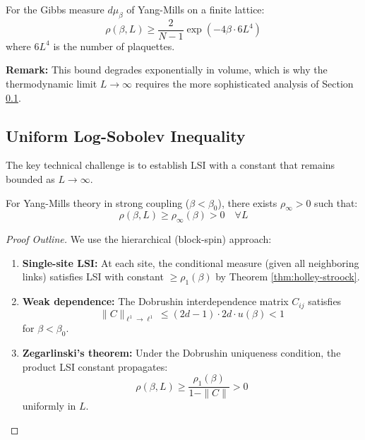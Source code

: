 \begin{corollary}\label{cor:ym-lsi}
For the Gibbs measure $d\mu_\beta$ of Yang-Mills on a finite lattice:
\begin{equation}
    \rho(\beta, L) \geq \frac{2}{N-1} \exp\left(-4\beta \cdot 6L^4\right)
\end{equation}
where $6L^4$ is the number of plaquettes.
\end{corollary}

\textbf{Remark:} This bound degrades exponentially in volume, which is why the thermodynamic limit $L \to \infty$ requires the more sophisticated analysis of Section \ref{sec:uniform-lsi-ch1}.

\subsection{Uniform Log-Sobolev Inequality}
\label{sec:uniform-lsi-ch1}

The key technical challenge is to establish LSI with a constant that remains bounded as $L \to \infty$.

\begin{theorem}\label{thm:zegarlinski}
For Yang-Mills theory in strong coupling ($\beta < \beta_0$), there exists $\rho_\infty > 0$ such that:
\begin{equation}
    \rho(\beta, L) \geq \rho_\infty(\beta) > 0 \quad \forall L
\end{equation}
\end{theorem}

\begin{proof}[Proof Outline]
We use the hierarchical (block-spin) approach:
\begin{enumerate}
    \item \textbf{Single-site LSI:} At each site, the conditional measure (given all neighboring links) satisfies LSI with constant $\geq \rho_1(\beta)$ by Theorem \ref{thm:holley-stroock}.
    
    \item \textbf{Weak dependence:} The Dobrushin interdependence matrix $C_{ij}$ satisfies
    \begin{equation}
        \|C\|_{\ell^1 \to \ell^1} \leq (2d-1) \cdot 2d \cdot u(\beta) < 1
    \end{equation}
    for $\beta < \beta_0$.
    
    \item \textbf{Zegarlinski's theorem:} Under the Dobrushin uniqueness condition, the product LSI constant propagates:
    \begin{equation}
        \rho(\beta, L) \geq \frac{\rho_1(\beta)}{1 - \|C\|} > 0
    \end{equation}
    uniformly in $L$.
\end{enumerate}
\end{proof}


